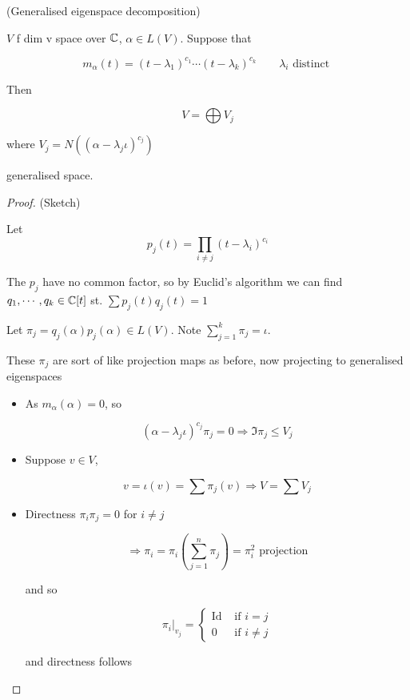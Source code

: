 \documentclass[a4paper]{article}
\begin{document}
\begin{thm} (Generalised eigenspace decomposition)
	
	$ V $ f dim v space over $ \mathbb{C} $, $ \alpha \in L(V ) $. Suppose that 
	
	\[ m_{\alpha} (t) = (t - \lambda_{1})^{c_{1}} \cdots (t - \lambda_{k})^{c_{k}}  \qquad \lambda_{i} \text{ distinct }\]
	
	Then
	
	\[ V = \bigoplus V_{j} \]
	
	where $ V_{j} = N(  ( \alpha - \lambda_{j} \iota )^{c_{j}} ) $
	
	generalised space.
	
\end{thm}

\begin{proof}(Sketch)
	
	Let \[ p_{j}(t) = \prod_{i \neq j} (t - \lambda_{i})^{c_{i}}   \]
	
	The $ p_{j} $ have no common factor, so by Euclid's algorithm we can find $ q_{1}, \cdots, q_{k} \in \mathbb{C} [t]  $ st. $ \sum p_{j}(t) q_{j}(t) = 1 $
	
	
	Let $ \pi_{j} = q_{j}(\alpha) p_{j}(\alpha) \in L(V)  $. Note $ \sum_{j=1}^{k} \pi_{j} = \iota$.
	
	These $ \pi_{j} $ are sort of like projection maps as before, now projecting to generalised eigenspaces
	
	\begin{itemize}
		\item As $ m_{\alpha}(\alpha) = 0 $, so 
		
		\[ (  \alpha - \lambda_{j} \iota )^{c_{j}} \pi_{j} = 0 \Rightarrow \Im \pi_{j} \leq V_{j}   \]
		
		
		\item Suppose $ v \in V $,
		
		\[ v = \iota(v) = \sum \pi_{j}(v) \Rightarrow V = \sum V_{j} \]

		\item Directness $ \pi_{i} \pi_{j} = 0 $ for $ i \neq j $
		
		\[ \Rightarrow \pi_{i} = \pi_{i} \left( \sum_{j=1}^{n} \pi_{j} \right)  = \pi_{i}^{2} \text{ projection}  \]
		
		and so
		
		\[ \pi_{i} |_{v_{j}} = \begin{cases} \text{Id}  & \text{ if } i = j \\ 0 & \text{ if } i \neq j \end{cases}  \]

		and directness follows
	\end{itemize}
	
\end{proof}
\end{document}
